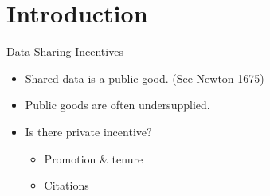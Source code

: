 \documentclass{beamer}
\begin{document}


\section{Introduction}

\begin{frame}{Data Sharing Incentives}{}

  \begin{itemize}
  \item
    Shared data is a public good. (See Newton 1675)
  \item
    Public goods are often undersupplied.
  \item 
  	 Is there private incentive?
  	 \begin{itemize}
  	 \item Promotion \& tenure
  	 \item Citations
  	 \end{itemize} 
  \end{itemize}
\end{frame}
\end{document}

